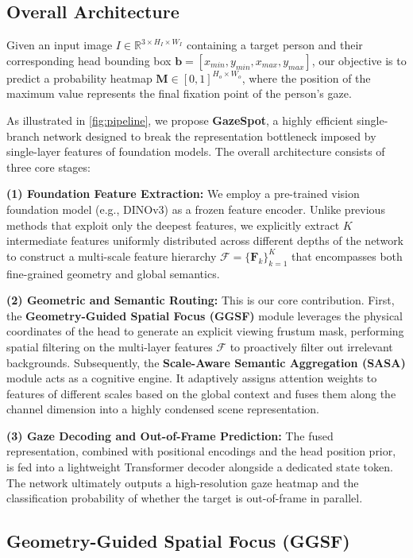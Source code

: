 \documentclass[sigconf,review,anonymous,screen]{acmart}
\begin{document}
\subsection{Overall Architecture}

Given an input image $I \in \mathbb{R}^{3 \times H_I \times W_I}$ containing a target person and their corresponding head bounding box $\mathbf{b} = [x_{min}, y_{min}, x_{max}, y_{max}]$, our objective is to predict a probability heatmap $\mathbf{M} \in [0, 1]^{H_o \times W_o}$, where the position of the maximum value represents the final fixation point of the person's gaze.

As illustrated in \autoref{fig:pipeline}, we propose \textbf{GazeSpot}, a highly efficient single-branch network designed to break the representation bottleneck imposed by single-layer features of foundation models. The overall architecture consists of three core stages:

\textbf{(1) Foundation Feature Extraction:} We employ a pre-trained vision foundation model (e.g., DINOv3) as a frozen feature encoder. Unlike previous methods that exploit only the deepest features, we explicitly extract $K$ intermediate features uniformly distributed across different depths of the network to construct a multi-scale feature hierarchy $\mathcal{F} = \{\mathbf{F}_k\}_{k=1}^K$ that encompasses both fine-grained geometry and global semantics.

\textbf{(2) Geometric and Semantic Routing:} This is our core contribution. First, the \textbf{Geometry-Guided Spatial Focus (GGSF)} module leverages the physical coordinates of the head to generate an explicit viewing frustum mask, performing spatial filtering on the multi-layer features $\mathcal{F}$ to proactively filter out irrelevant backgrounds. Subsequently, the \textbf{Scale-Aware Semantic Aggregation (SASA)} module acts as a cognitive engine. It adaptively assigns attention weights to features of different scales based on the global context and fuses them along the channel dimension into a highly condensed scene representation.

\textbf{(3) Gaze Decoding and Out-of-Frame Prediction:} The fused representation, combined with positional encodings and the head position prior, is fed into a lightweight Transformer decoder alongside a dedicated state token. The network ultimately outputs a high-resolution gaze heatmap and the classification probability of whether the target is out-of-frame in parallel.

\subsection{Geometry-Guided Spatial Focus (GGSF)}
\end{document}
